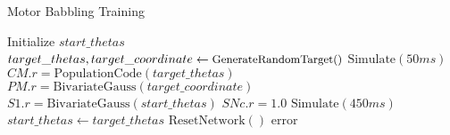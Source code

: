 \documentclass[a4, landscape]{article}
\begin{document}
		
	\begin{algorithm}
		\caption{Motor Babbling Training}
		\begin{algorithmic}[1]
			\State Initialize $start\_thetas$
			\State $target\_thetas, target\_coordinate \gets \text{\small GenerateRandomTarget()}$
			\State $\text{Simulate}(50 ms)$
			\State $CM.r = \text{PopulationCode}(target\_thetas)$
			\State $PM.r = \text{BivariateGauss}(target\_coordinate)$
			\State $S1.r = \text{BivariateGauss}(start\_thetas)$
			\State $SNc.r = 1.0$
			\State $\text{Simulate}(450 ms)$
			\State $start\_thetas \gets target\_thetas$
			\State $\text{ResetNetwork}()$
			\EndFor
			\EndFunction
			\Return error
			\EndFunction
			\EndFor
		\end{algorithmic}
	\end{algorithm}
	
\end{document}
